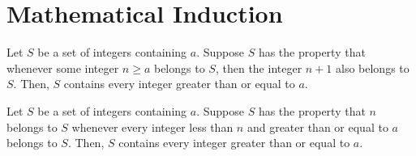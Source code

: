 \section{Mathematical Induction}

\begin{theorem}
	Let $S$ be a set of integers containing $a$. Suppose $S$ has the property that whenever some integer $n \geq a$ belongs to $S$, then the integer $n + 1$ also belongs to $S$. Then, $S$ contains every integer greater than or equal to $a$.
\end{theorem}

\begin{theorem}
	Let $S$ be a set of integers containing $a$. Suppose $S$ has the property that $n$ belongs to $S$ whenever every integer less than $n$ and greater than or equal to $a$ belongs to $S$. Then, $S$ contains every integer greater than or equal to $a$.
\end{theorem}
